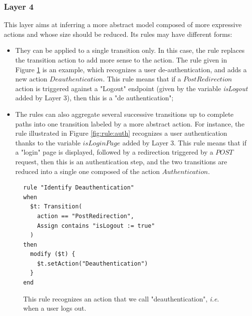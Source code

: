 \subsubsection{Layer 4}

This layer aims at inferring a more abstract model composed of
more expressive actions and whose size should be reduced. Its
rules may have different forms:

\begin{itemize}
\item They can be applied to a single transition only. In this
case, the rule replaces the transition action to add more sense
to the action. The rule given in Figure \ref{fig:rule:deauth} is
an example, which recognizes a user de-authentication, and adds a
new action $Deauthentication$. This rule means that if a
$PostRedirection$ action is triggered against a "Logout" endpoint
(given by the variable \textit{isLogout} added by Layer 3), then
this is a "de authentication";

\item The rules can also aggregate several successive transitions
up to complete paths into one transition labeled by a more
abstract action. For instance, the rule illustrated in Figure
\ref{fig:rule:auth} recognizes a user authentication thanks to
the variable $isLoginPage$ added by Layer 3. This rule means that
if a "login" page is displayed, followed by a redirection
triggered by a $POST$ request, then this is an authentication
step, and the two transitions are reduced into a single one
composed of the action $Authentication$.
\end{itemize}

\begin{figure}[h]
\begin{framed}
\begin{BVerbatim}
rule "Identify Deauthentication"
when
  $t: Transition(
    action == "PostRedirection",
    Assign contains "isLogout := true"
  )
then
  modify ($t) {
    $t.setAction("Deauthentication")
  }
end
\end{BVerbatim}
\end{framed}

    \caption{This rule recognizes an action that we call
    "deauthentication", \emph{i.e.} when a user logs out.}
    \label{fig:rule:deauth}
\end{figure}


